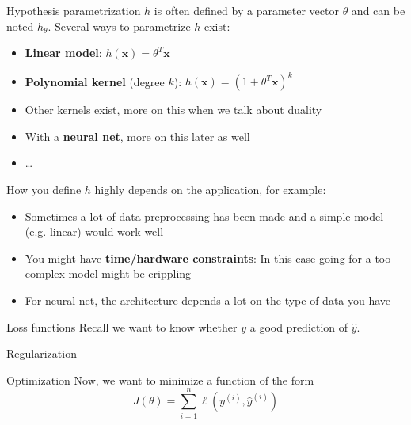 \documentclass{beamer}
\newcommand{\yhat}{\hat{y}}
\newcommand{\bx}{\bm{x}}
\newcommand{\yi}{y^{(i)}}
\newcommand{\yhati}{\hat{y}^{(i)}}
\begin{document}
\begin{frame}{Hypothesis parametrization}
$h$ is often defined by a parameter vector $\theta$ and can be noted $h_\theta$. \pause Several ways to parametrize $h$ exist:
\begin{itemize}
	\item \textbf{Linear model}: $h(\bx) = \theta^T \bx$
	\item \textbf{Polynomial kernel} (degree $k$): $h(\bx) = \left(1 + \theta^T \bx\right)^k$
	\item Other kernels exist, more on this when we talk about duality
	\item With a \textbf{neural net}, more on this later as well
	\item \ldots
\end{itemize}
\vfill
\pause
How you define $h$ highly depends on the application, for example:
\begin{itemize}
	\item Sometimes a lot of data preprocessing has been made and a simple model (e.g. linear) would work well
	\item You might have \textbf{time/hardware constraints}: In this case going for a too complex model might be crippling
	\item For neural net, the architecture depends a lot on the type of data you have
\end{itemize}
\end{frame}

\begin{frame}{Loss functions}
Recall we want to know whether $y$ a good prediction of $\yhat$.
\end{frame}

\begin{frame}{Regularization}

\end{frame}

\begin{frame}{Optimization}
Now, we want to minimize a function of the form
\begin{equation}
J(\theta) = \sum_{i = 1}^{n} \ell\left(\yi, \yhati\right)
\end{equation}
\end{frame}
\end{document}
